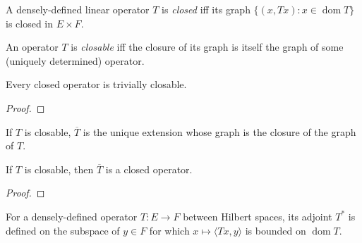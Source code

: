 \begin{definition}
  \label{def:closed-operator}
  \leanok
  A densely-defined linear operator $T$ is \emph{closed} iff its graph
  $\{(x, T x) : x \in \operatorname{dom} T\}$ is closed in $E \times F$.
\end{definition}

\begin{definition}
  \label{def:closable-operator}
  \leanok
  An operator $T$ is \emph{closable} iff the closure of its graph is
  itself the graph of some (uniquely determined) operator.
\end{definition}

\begin{theorem}
  \label{thm:closed-closable}
  \leanok
  Every closed operator is trivially closable.
\end{theorem}
\begin{proof}
  \leanok
\end{proof}

\begin{definition}
  \label{def:closure-operator}
  \leanok
  If $T$ is closable, $\overline{T}$ is the unique extension whose
  graph is the closure of the graph of $T$.
\end{definition}

\begin{theorem}
  \label{thm:closure-closed}
  \leanok
  If $T$ is closable, then $\overline{T}$ is a closed operator.
\end{theorem}
\begin{proof}
  \leanok
\end{proof}

\begin{definition}
  \label{def:pmap-adjoint}
  \leanok
  For a densely-defined operator $T\colon E \to F$ between Hilbert
  spaces, its adjoint $T^{*}$ is defined on the subspace of $y \in F$
  for which $x \mapsto \langle T x, y\rangle$ is bounded on
  $\operatorname{dom} T$.
\end{definition}

